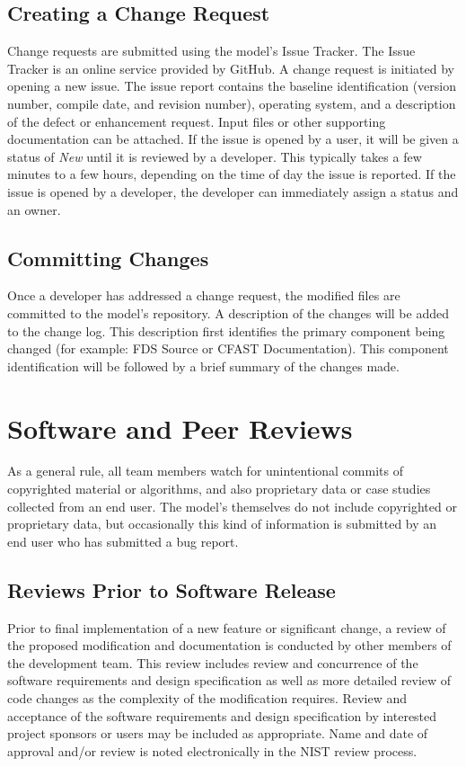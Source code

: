 \documentclass[11pt]{book}
\begin{document}
\subsection{Creating a Change Request}

Change requests are submitted using the model's Issue Tracker.  The Issue Tracker is an online service provided by GitHub. A change request is initiated by opening a new issue.  The issue report contains the baseline identification (version number, compile date, and revision number), operating system, and a description of the defect or enhancement request.  Input files or other supporting documentation can be attached. If the issue is opened by a user, it will be given a status of {\em New} until it is reviewed by a developer. This typically takes a few minutes to a few hours, depending on the time of day the issue is reported. If the issue is opened by a developer, the developer can immediately assign a status and an owner.


\subsection{Committing Changes}

Once a developer has addressed a change request, the modified files are committed to the model's repository.  A description of the changes will be added to the change log.  This description first identifies the primary component being changed (for example: FDS Source or CFAST Documentation).  This component identification will be followed by a brief summary of the changes made.



\section{Software and Peer Reviews}


As a general rule, all team members watch for unintentional commits of copyrighted material or algorithms, and also proprietary data or case studies collected from an end user. The model's themselves do not include copyrighted or proprietary data, but occasionally this kind of information is submitted by an end user who has submitted a bug report.

\subsection{Reviews Prior to Software Release}

Prior to final implementation of a new feature or significant change, a review of the proposed modification and documentation is conducted by other members of the development team.  This review includes review and concurrence of the software requirements and design specification as well as more detailed review of code changes as the complexity of the modification requires. Review and acceptance of the software requirements and design specification by interested project sponsors or users may be included as appropriate. Name and date of approval and/or review is noted electronically in the NIST review process.
\end{document}
